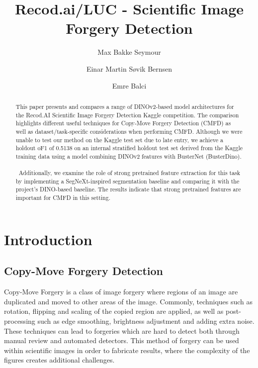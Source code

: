 \documentclass[final]{nldl}
\title{Recod.ai/LUC - Scientific Image Forgery Detection}
\author[1]{Max Bakke Seymour}
\author[1]{Einar Martin Søvik Bernsen}
\author[1]{Emre Balci}
\affil[1]{University of Bergen (UiB)}
\begin{document}
\maketitle

\begin{abstract}
This paper presents and compares a range of DINOv2-based model architectures for the Recod.AI Scientific Image Forgery Detection Kaggle competition. The comparison highlights different useful techniques for Copy-Move Forgery Detection (CMFD) as well as dataset/task-specific considerations when performing CMFD. Although we were unable to test our method on the Kaggle test set due to late entry, we achieve a holdout oF1 of 0.5138 on an internal stratified holdout test set derived from the Kaggle training data using a model combining DINOv2 features with BusterNet (BusterDino).
\\\\\
Additionally, we examine the role of strong pretrained feature extraction for this task by implementing a SegNeXt-inspired segmentation baseline and comparing it with the project's DINO-based baseline. The results indicate that strong pretrained features are important for CMFD in this setting.
\end{abstract}

\section{Introduction}

\subsection{Copy-Move Forgery Detection}

Copy-Move Forgery is a class of image forgery where regions of an image are duplicated and moved to other areas of the image. Commonly, techniques such as rotation, flipping and scaling of the copied region are applied, as well as post-processing such as edge smoothing, brightness adjustment and adding extra noise. These techniques can lead to forgeries which are hard to detect both through manual review and automated detectors. This method of forgery can be used within scientific images in order to fabricate results, where the complexity of the figures creates additional challenges. \cite{kaggle}
\end{document}
